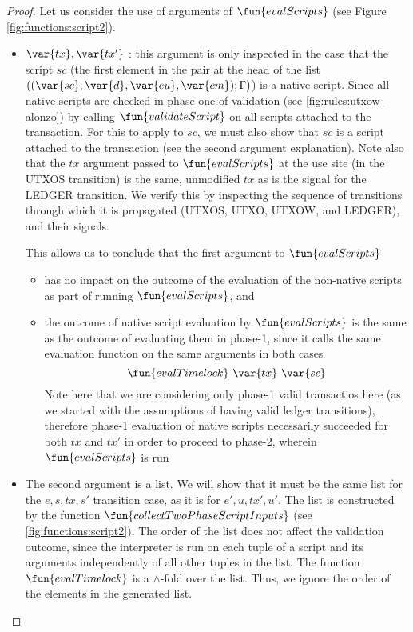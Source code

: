\begin{property}
\begin{lemma}
\end{lemma}
\begin{proof}
  Let us consider the use of arguments of $\fun{evalScripts}$ (see Figure \ref{fig:functions:script2}).
  \begin{itemize}
    \item $\var{tx}, \var{tx'}$ : this argument is only inspected in the case that the script $sc$ (the first element
    in the pair at the head of the list
    $((\var{sc}, \var{d}, \var{eu}, \var{cm});\Gamma)$) is a native script. Since all native scripts
    are checked in phase one of validation (see \ref{fig:rules:utxow-alonzo}) by calling $\fun{validateScript}$
    on all scripts attached to the transaction. For this to apply to $sc$, we must also show
    that $sc$ is a script attached to the transaction (see the second argument explanation).
    Note also that the $tx$ argument passed to $\fun{evalScripts}$ at the use site (in the UTXOS transition)
    is the same, unmodified $tx$ as is the signal for the LEDGER transition. We verify this by inspecting
    the sequence of transitions through which it is propagated (UTXOS, UTXO, UTXOW, and LEDGER), and their signals.

    This allows us to conclude that the first argument to $\fun{evalScripts}$
    \begin{itemize}
      \item has no impact on the outcome of the evaluation of the non-native scripts
      as part of running $\fun{evalScripts}$, and
      \item the outcome of native script evaluation by $\fun{evalScripts}$ is the
      same as the outcome of evaluating them in phase-1, since
      it calls the same evaluation function on the same arguments in both cases
      \[\fun{evalTimelock}~\var{tx}~\var{sc}\]
      Note here that we are considering only phase-1 valid transactios here (as we started
      with the assumptions of having valid ledger transitions), therefore
      phase-1 evaluation of native scripts necessarily succeeded for both $tx$ and $tx'$
      in order to proceed to phase-2, wherein $\fun{evalScripts}$ is run
    \end{itemize}

    \item The second argument is a list. We will show that it must be the same list for the $e, s, tx, s'$
    transition case, as it is for $e', u, tx', u'$. The list is constructed by the
    function $\fun{collectTwoPhaseScriptInputs}$ (see \ref{fig:functions:script2}).
    The order of the list does not affect the validation outcome, since the interpreter is run
    on each tuple of a script and its arguments independently of all other tuples in the list.
    The function $\fun{evalTimelock}$ is a $\wedge$-fold over the list. Thus, we ignore the order
    of the elements in the generated list.


\end{itemize}
\end{proof}
\end{property}
